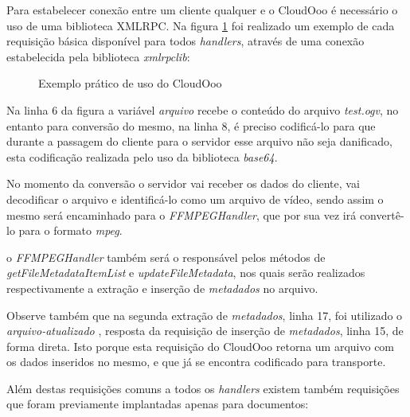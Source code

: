 Para estabelecer conexão entre um cliente qualquer e o CloudOoo é necessário o uso de uma biblioteca XMLRPC. Na figura \ref{conexao} foi realizado um exemplo de cada requisição básica disponível para todos \textit{handlers}, através de uma conexão estabelecida pela biblioteca \textit{xmlrpclib}:

\begin{figure}[ht]
    \centering
    \caption{Exemplo prático de uso do CloudOoo}
    \label{conexao}
\end{figure}

Na linha 6 da figura a variável \textit{arquivo} recebe o conteúdo do arquivo \textit{test.ogv}, no entanto para conversão do mesmo, na linha 8, é preciso codificá-lo para que durante a passagem do cliente para o servidor esse arquivo não seja danificado, esta codificação  realizada pelo uso da biblioteca \textit{base64}.

No momento da conversão o servidor vai receber os dados do cliente, vai decodificar o arquivo e identificá-lo como um arquivo de vídeo, sendo assim o mesmo será encaminhado para o \textit{FFMPEGHandler}, que por sua vez irá convertê-lo para o formato \textit{mpeg}.

o \textit{FFMPEGHandler} também será o responsável pelos métodos de \textit{getFileMetadataItemList} e \textit{updateFileMetadata}, nos quais serão realizados respectivamente a extração e inserção de \textit{metadados} no arquivo.

Observe também que na segunda extração de \textit{metadados}, linha 17, foi utilizado o \textit{arquivo-atualizado} , resposta da requisição de inserção de \textit{metadados}, linha 15, de forma direta. Isto porque esta requisição do CloudOoo retorna um arquivo com os dados inseridos no mesmo, e que já se encontra codificado para transporte.

Além destas requisições comuns a todos os \textit{handlers} existem também requisições que foram previamente implantadas apenas para documentos:

